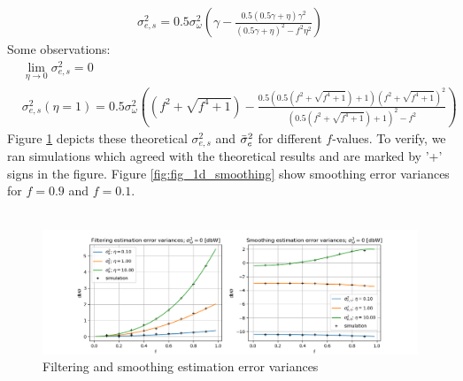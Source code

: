 \documentclass[oneside,12pt]{article}
\begin{document}
%
\begin{equation}\label{eq:smoothing_err}
    \begin{split}
        \sigma_{e,s}^2 = 0.5 \sigma_\omega^2 \left( \gamma - \frac{0.5(0.5\gamma+\eta)\gamma^2}{(0.5\gamma+\eta)^2-f^2\eta^2}\right)
    \end{split}
\end{equation}
%
Some observations:
\begin{equation*}
    \begin{split}
        &\operatorname{lim}_{\eta \xrightarrow{} 0}\sigma_{e,s}^2 = 0\\
        &\sigma_{e,s}^2(\eta=1) = 0.5 \sigma_\omega^2 \left( (f^2+\sqrt{f^4+1}) - \frac{0.5(0.5(f^2+\sqrt{f^4+1})+1)(f^2+\sqrt{f^4+1})^2}{(0.5(f^2+\sqrt{f^4+1})+1)^2-f^2}\right)
    \end{split}
\end{equation*}
%
Figure \ref{fig:sm_vs_fl_different_f} depicts these theoretical $\sigma_{e,s}^2$ and $\Bar{\sigma}_e^2$ for different $f$-values. To verify, we ran simulations which agreed with the theoretical results and are marked by '+' signs in the figure. Figure \ref{fig:fig_1d_smoothing} show smoothing error variances for $f=0.9$ and $f=0.1$.\\\\
%
\begin{figure}
    \centering
        \includegraphics[width=1\textwidth]{./sm_vs_fl_different_f}
        \caption{\label{fig:sm_vs_fl_different_f}Filtering and smoothing estimation error variances}
\end{figure}
%
%
\end{document}
